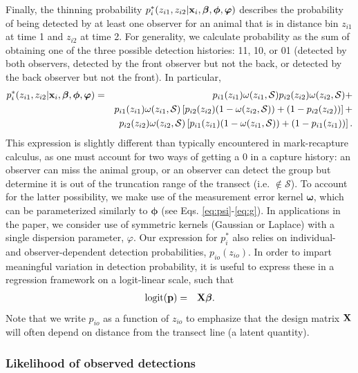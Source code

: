 \documentclass[aoas,preprint]{imsart}
\numberwithin{equation}{section}
\theoremstyle{plain}
\begin{document}
Finally, the thinning probability
$p_i^*(z_{i1},z_{i2}|{\bf x}_i,\boldsymbol{\beta},\boldsymbol{\phi},\boldsymbol{\varphi})$ describes the probability of being detected by at least one observer for an animal that is in distance bin $z_{i1}$ at time 1 and $z_{i2}$ at time 2. For generality, we calculate probability as the sum of obtaining one of the three possible detection histories: 11, 10, or 01 (detected by both observers, detected by the front observer but not the back, or detected by the back observer but not the front).  In particular,
\begin{eqnarray*}
  \label{eq:pstar}
  p_i^*(z_{i1},z_{i2}|{\bf x}_i,\boldsymbol{\beta},\boldsymbol{\phi},\boldsymbol{\varphi}) & = &
  p_{i1}(z_{i1}) \omega(z_{i1},\mathcal{S}) p_{i2}(z_{i2})
  \omega(z_{i2},\mathcal{S}) + \\
   & & p_{i1}(z_{i1})\omega(z_{i1},\mathcal{S}) \left[
   p_{i2}(z_{i2})(1-\omega(z_{i2},\mathcal{S}))+(1-p_{i2}(z_{i2})) \right] + \nonumber \\
   & & p_{i2}(z_{i2})\omega(z_{i2},\mathcal{S}) \left[
   p_{i1}(z_{i1})(1-\omega(z_{i1},\mathcal{S}))+(1-p_{i1}(z_{i1})) \right]. \nonumber
\end{eqnarray*}
This expression is slightly different than typically encountered in mark-recapture calculus, as one must account for two ways of getting a 0 in a capture history: an observer can miss the animal group, or an observer can detect the group but determine it is out of the truncation range of the transect (i.e. $\notin \mathcal{S}$).  To account for the latter possibility, we make use of the measurement error kernel $\boldsymbol{\omega}$, which can be parameterized similarly to $\boldsymbol{\phi}$ (see Eqs. \ref{eq:psi}-\ref{eq:g}).  In applications in the paper, we consider use of symmetric kernels (Gaussian or Laplace) with a single dispersion parameter, $\varphi$.  Our expression for $p_i^*$ also relies on individual- and observer-dependent detection probabilities, $p_{io}(z_{io})$.  In order to impart meaningful variation in detection probability, it is useful to express these in a regression framework on a logit-linear scale, such that
\begin{eqnarray}
  \textrm{logit}({\bf p}) & = & {\bf X} \boldsymbol{\beta}.
  \label{eq:p}
\end{eqnarray}
Note that we write $p_{io}$ as a function of $z_{io}$ to emphasize that the design matrix ${\bf X}$ will often depend on distance from the transect line (a latent quantity).

\subsubsection{Likelihood of observed detections}
\end{document}
